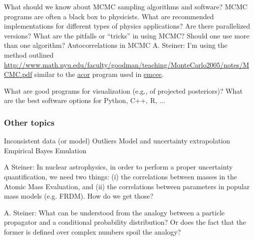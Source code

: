   \bi
    \I What should we know about MCMC sampling algorithms and
      software?
    \bi
      \I MCMC programs are often a black box to physicists.
      \I What are recommended implementations for different
	types of physics applications?
      \I Are there parallelized versions?
      \I What are the pitfalls or ``tricks'' in using MCMC?
      \I Should one use more than one algorithm?
    \I Autocorrelations in MCMC
    \bi
      \I A. Steiner: I'm using the method outlined
	\url{http://www.math.nyu.edu/faculty/goodman/teaching/MonteCarlo2005/notes/MCMC.pdf}
	similar to the \href{http://www.math.nyu.edu/faculty/goodman/software/acor/}{acor} program used in \href{http://dan.iel.fm/emcee/}{emcee}.
      
    \ei
    \ei
    \I What are good programs for visualization (e.g., of
      projected posteriors)?
    \I What are the best software options for Python, C++, R, ...  
  \ei

  \subsubsection{Other topics}

  \bi
    \I Inconsistent data (or model)
    \I Outliers
    \I Model and uncertainty extrapolation
    \I Empirical Bayes
    \I Emulation

    \I 
      A Steiner: In nuclear astrophysics, in order to
      perform a proper uncertainty quantification, we need two
      things: (i) the correlations between masses in the
      Atomic Mass Evaluation, and (ii) the correlations
      between parameters in popular mass models (e.g. FRDM).
      How do we get those?
    
    \I A. Steiner: What can be understood from the
      analogy between a particle propagator and a conditional
      probability distribution? Or does the fact that the
      former is defined over complex numbers spoil the analogy?
    \ei

